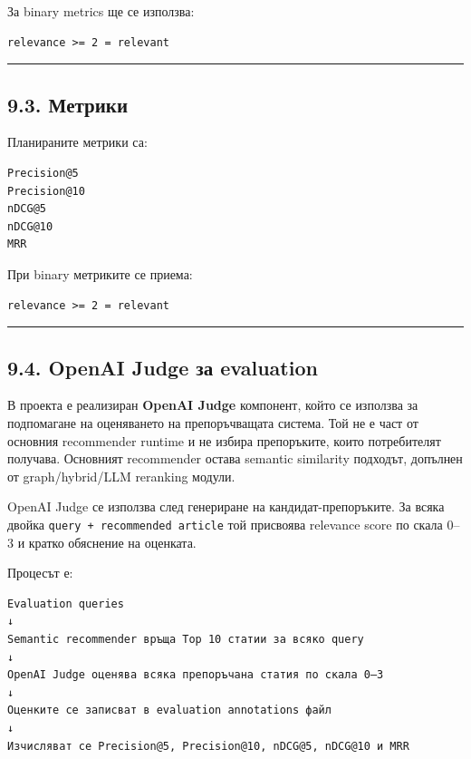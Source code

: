 \documentclass[12pt,a4paper]{article}
\begin{document}
За binary metrics ще се използва:

\begin{verbatim}
relevance >= 2 = relevant
\end{verbatim}

\vspace{0.5em}\hrule\vspace{1.0em}

\subsection{9.3. Метрики}\label{ux43cux435ux442ux440ux438ux43aux438}

Планираните метрики са:

\begin{verbatim}
Precision@5
Precision@10
nDCG@5
nDCG@10
MRR
\end{verbatim}

При binary метриките се приема:

\begin{verbatim}
relevance >= 2 = relevant
\end{verbatim}

\vspace{0.5em}\hrule\vspace{1.0em}

\subsection{9.4. OpenAI Judge за evaluation}\label{openai-judge-ux437ux430-evaluation}

В проекта е реализиран \textbf{OpenAI Judge} компонент, който се използва за подпомагане на оценяването на препоръчващата система. Той не е част от основния recommender runtime и не избира препоръките, които потребителят получава. Основният recommender остава semantic similarity подходът, допълнен от graph/hybrid/LLM reranking модули.

OpenAI Judge се използва след генериране на кандидат-препоръките. За всяка двойка \texttt{query\ +\ recommended\ article} той присвоява relevance score по скала 0--3 и кратко обяснение на оценката.

Процесът е:

\begin{verbatim}
Evaluation queries
↓
Semantic recommender връща Top 10 статии за всяко query
↓
OpenAI Judge оценява всяка препоръчана статия по скала 0–3
↓
Оценките се записват в evaluation annotations файл
↓
Изчисляват се Precision@5, Precision@10, nDCG@5, nDCG@10 и MRR
\end{verbatim}
\end{document}
